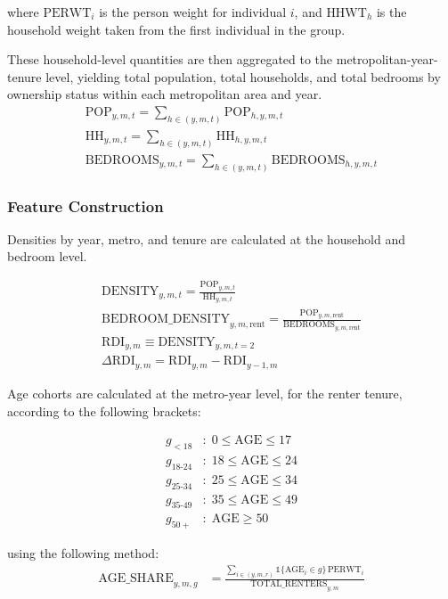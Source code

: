 \documentclass[pdflatex,sn-basic]{sn-jnl}%
\theoremstyle{thmstyleone}%
\theoremstyle{thmstyletwo}%
\theoremstyle{thmstylethree}%
\begin{document}
where \( \text{PERWT}_i \) is the person weight for individual \( i \), and \( \text{HHWT}_{h} \) is the household weight taken from the first individual in the group.

These household-level quantities are then aggregated to the metropolitan-year-tenure level, yielding total population, total households, and total bedrooms by ownership status within each metropolitan area and year.
\begin{align}
	\text{POP}_{y,m,t} = \sum_{h \in (y,m,t)} \text{POP}_{h,y,m,t}\\
	\text{HH}_{y,m,t} = \sum_{h \in (y,m,t)} \text{HH}_{h,y,m,t}\\
	\text{BEDROOMS}_{y,m,t} = \sum_{h \in (y,m,t)} \text{BEDROOMS}_{h,y,m,t}
\end{align}

\subsubsection{Feature Construction}
Densities by year, metro, and tenure are calculated at the household and bedroom level.

\begin{align}
\text{DENSITY}_{y,m,t} = \frac{\text{POP}_{y,m,t}}{\text{HH}_{y,m,t}}\\
\text{BEDROOM\_DENSITY}_{y,m,\text{rent}} =
\frac{\text{POP}_{y,m,\text{rent}}}{\text{BEDROOMS}_{y,m,\text{rent}}}\\
\text{RDI}_{y,m} \equiv \text{DENSITY}_{y,m,t=2} \\
\Delta \text{RDI}_{y,m} = \text{RDI}_{y,m} - \text{RDI}_{y-1,m}
\end{align}



Age cohorts are calculated at the metro-year level, for the renter tenure, according to the following brackets:

\[
\begin{aligned}
	g_{<18} &: \; 0 \le \text{AGE} \le 17 \\
	g_{18\text{-}24} &: \; 18 \le \text{AGE} \le 24 \\
	g_{25\text{-}34} &: \; 25 \le \text{AGE} \le 34 \\
	g_{35\text{-}49} &: \; 35 \le \text{AGE} \le 49 \\
	g_{50+} &: \; \text{AGE} \ge 50
\end{aligned}
\]

using the following method:
\begin{align}
	\text{AGE\_SHARE}_{y,m,g}
	&=
	\frac{
		\sum_{i \in (y,m,r)}
		\mathbb{1}\{\text{AGE}_i \in g\}\,\text{PERWT}_i
	}{
		\text{TOTAL\_RENTERS}_{y,m}
	}
\end{align}
\end{document}
